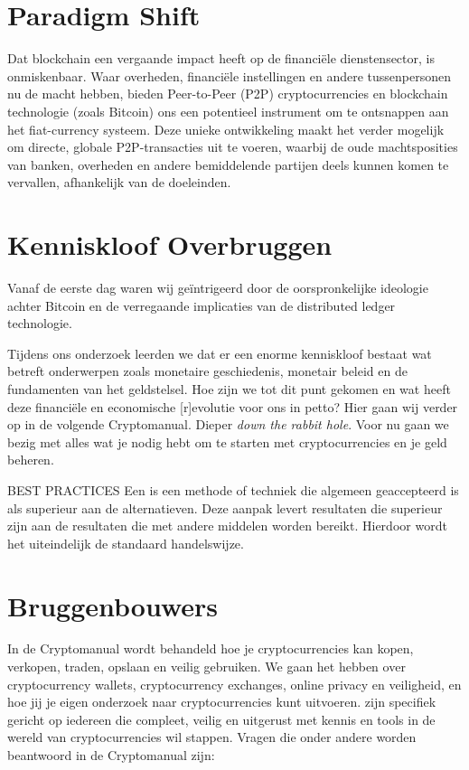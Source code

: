 \section*{Paradigm Shift}
Dat blockchain een vergaande impact heeft op de financi{\"e}le dienstensector, is onmiskenbaar. Waar overheden, financi{\"e}le instellingen en andere tussenpersonen nu de macht hebben, bieden Peer-to-Peer (P2P) cryptocurrencies en blockchain technologie (zoals Bitcoin) ons een potentieel instrument om te ontsnappen aan het fiat-currency systeem. Deze unieke ontwikkeling maakt het verder mogelijk om directe, globale P2P-transacties uit te voeren, waarbij de oude machtsposities van banken, overheden en andere bemiddelende partijen deels kunnen komen te vervallen, afhankelijk van de doeleinden.\medskip

\section*{Kenniskloof Overbruggen}
Vanaf de eerste dag waren wij ge{\"i}ntrigeerd door de oorspronkelijke ideologie achter Bitcoin en de verregaande implicaties van de distributed ledger technologie. 


Tijdens ons onderzoek leerden we dat er een enorme kenniskloof bestaat wat betreft onderwerpen zoals monetaire geschiedenis, monetair beleid en de fundamenten van het geldstelsel. Hoe zijn we tot dit punt gekomen en wat heeft deze financi{\"e}le en economische [r]evolutie voor ons in petto? Hier gaan wij verder op in de volgende Cryptomanual. Dieper \emph{down the rabbit hole}. Voor nu gaan we bezig met alles wat je nodig hebt om te starten met cryptocurrencies en je geld beheren.

    \bigskip 
    \begin{cryptobox}{BEST PRACTICES}
        Een  is een methode of techniek die algemeen geaccepteerd is als superieur aan de alternatieven. Deze aanpak levert resultaten die superieur zijn aan de resultaten die met andere middelen worden bereikt. Hierdoor wordt het uiteindelijk de standaard handelswijze.
    \end{cryptobox}


\section*{Bruggenbouwers}
In de {\selectfont Cryptomanual} wordt behandeld hoe je cryptocurrencies kan kopen, verkopen, traden, opslaan en veilig gebruiken. We gaan het hebben over cryptocurrency wallets, cryptocurrency exchanges, online privacy en veiligheid, en hoe jij je
eigen onderzoek naar cryptocurrencies kunt uitvoeren.  zijn specifiek gericht op iedereen die compleet, veilig en uitgerust met kennis en tools in de wereld van cryptocurrencies wil stappen. Vragen die onder andere worden beantwoord in de {\selectfont Cryptomanual} zijn:

